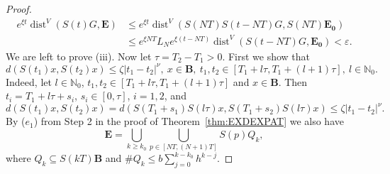 \documentclass[10pt,a4paper]{amsart}
\newcommand{\N}{\mathbb{N}}
\newcommand{\abs}[1]{\left\vert#1\right\vert}
\newcommand{\dist}{\operatorname{dist}}
\newcommand{\eps}{\varepsilon}
\renewcommand{\geq}{\geqslant}
\renewcommand{\leq}{\leqslant}
\begin{document}
\begin{proof}
\begin{align*}
e^{\xi t}\dist^{V}(S(t)G,\mathbf{E})&\leq e^{\xi t}\dist^{V}(S(NT)S(t-NT)G,S(NT)\mathbf{E_0})\\
&\leq e^{\xi NT}L_{N}e^{\xi(t-NT)}\dist^{V}(S(t-NT)G,\mathbf{E_0})<\eps.
\end{align*}
We are left to prove (iii). Now let $\tau=T_2-T_1>0$. First we show that
\begin{equation}\label{e:HOLDERONSMALL}
d(S(t_1)x,S(t_2)x)\leq\zeta\abs{t_1-t_2}^{\nu},\ x\in \mathbf{B},\ t_1,t_2\in[T_1+l\tau,T_1+(l+1)\tau],\ l\in\N_0.
\end{equation}
Indeed, let $l\in\N_0$, $t_1,t_2\in[T_1+l\tau,T_1+(l+1)\tau]$ and $x\in\mathbf{B}$. Then $t_i=T_1+l\tau+s_i$, $s_i\in[0,\tau]$, $i=1,2$, and
$$d(S(t_1)x,S(t_2)x)=d(S(T_1+s_1)S(l\tau)x,S(T_1+s_2)S(l\tau)x)\leq\zeta\abs{t_1-t_2}^{\nu}.$$
By ($e_1$) from Step 2 in the proof of Theorem~\ref{thm:EXDEXPAT} we also have
$$\mathbf{E}=\bigcup_{k\geq k_0}\bigcup_{p\in[NT,(N+1)T]}S(p)Q_{k},$$
where $Q_k\subseteq S(kT)\mathbf{B}$ and $\displaystyle\# Q_k\leq b\sum_{j=0}^{k-k_0}h^{k-j}$.


\end{proof}
\end{document}
